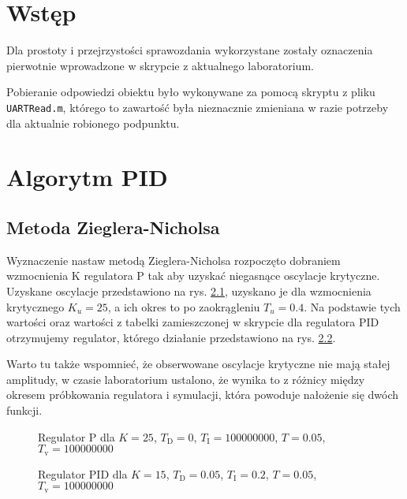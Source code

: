 \chapter{Wstęp}
Dla prostoty i przejrzystości sprawozdania wykorzystane zostały oznaczenia pierwotnie wprowadzone w skrypcie z aktualnego laboratorium\@.

Pobieranie odpowiedzi obiektu było wykonywane za pomocą skryptu z pliku \verb|UARTRead.m|, którego to zawartość była nieznacznie zmieniana w razie potrzeby dla aktualnie robionego podpunktu.

\chapter{Algorytm PID}

\section{Metoda Zieglera-Nicholsa}
Wyznaczenie nastaw metodą Zieglera-Nicholsa rozpoczęto dobraniem wzmocnienia K regulatora P tak aby uzyskać niegasnące oscylacje krytyczne. Uzyskane oscylacje przedstawiono na rys. \ref{R1}, uzyskano je dla wzmocnienia krytycznego $K_u = 25$, a ich okres to po zaokrągleniu $T_u = 0.4$. Na podstawie tych wartości oraz wartości z tabelki zamieszczonej w skrypcie dla regulatora PID otrzymujemy regulator, którego działanie przedstawiono na rys. \ref{R2}.

Warto tu także wspomnieć, że obserwowane oscylacje krytyczne nie mają stałej amplitudy, w czasie laboratorium ustalono, że wynika to z różnicy między okresem próbkowania regulatora i symulacji, która powoduje nałożenie się dwóch funkcji.

\begin{figure}[H]
\centering

\label{R1}
\caption{Regulator P dla $K = 25$, $T_\mathrm{D} = 0$, $T_\mathrm{I} = 100000000$, $T = 0.05$, $T_\mathrm{v} = 100000000$}
\end{figure}

\begin{figure}[H]
\centering

\label{R2}
\caption{Regulator PID dla $K = 15$, $T_\mathrm{D} = 0.05$, $T_\mathrm{I} = 0.2$, $T = 0.05$, $T_\mathrm{v} = 100000000$}
\end{figure}

